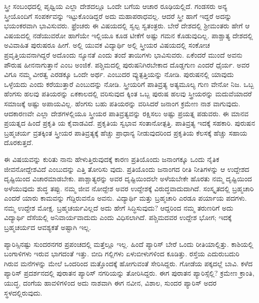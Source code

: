 ಸ್ತ್ರೀ ಸಂಬಂಧದಲ್ಲಿ ಪೃಥ್ವಿಯ ಎಲ್ಲಾ ದೇಶದಲ್ಲೂ ಒಂದೇ ಬಗೆಯ ಆಚಾರ ರೂಢಿಯಲ್ಲಿದೆ. ಗಂಡಸರು ಅನ್ಯ ಸ್ತ್ರೀಯೊಂದಿಗೆ ಸಂಪರ್ಕವನ್ನು ಇಟ್ಟುಕೊಂಡಿದ್ದರೆ ಅದು ಮಹಾಪರಾಧವಲ್ಲ. ಆದರೆ ಸ್ತ್ರೀ ಹಾಗೆ ಇದ್ದರೆ ಅದನ್ನು ಭಯಂಕರವಾಗಿ ಭಾವಿಸುವರು. ಫ್ರೆಂಚರು ಈ ವಿಷಯದಲ್ಲಿ ಸ್ವಲ್ಪ ಸ್ವತಂತ್ರರು. ಬೇರೆ ದೇಶದಲ್ಲಿ ಶ‍್ರೀಮಂತರು ಹೇಗೆ ಆ ವಿಷಯದಲ್ಲಿ ನಡೆಯುವರೋ ಹಾಗೆಯೇ ಇಲ್ಲಿಯೂ ಕೂಡ ಟೀಕೆಗೆ ಅಷ್ಟು ಗಮನ ಕೊಡುವುದಿಲ್ಲ. ಪಾಶ್ಚಾತ್ಯ ದೇಶದಲ್ಲಿ ಅವಿವಾಹಿತ ಪುರುಷರೂ ಹೀಗೆ. ಅಲ್ಲಿ ಯುವಕ ವಿದ್ಯಾರ್ಥಿ ಅಲ್ಲಿ ಸ್ತ್ರೀಯರ ವಿಷಯದಲ್ಲಿ ಸಂಕೋಚ ಪ್ರವೃತ್ತಿಯವನಾಗಿದ್ದರೆ ಅದೊಂದು ನ್ಯೂನತೆ ಎಂದು ತಂದೆ ತಾಯಿಗಳು ಭಾವಿಸುವರು. ಏಕೆಂದರೆ ಮುಂದೆ ಅವನು ಪೌರುಷ ಹೀನನಾಗುತ್ತಾನೆ ಎಂಬ ಅಂಜಿಕೆ. ಪಶ್ಚಿಮದಲ್ಲಿ ಪುರುಷನಿಗಿರಬೇಕಾದ ದೊಡ್ಡಗುಣ ಎಂದರೆ ಧೈರ್ಯ. ಅವರ  ವಿಗೂ ನಮ್ಮ ವೀರತ್ವ ಎರಡಕ್ಕೂ ಒಂದೇ ಅರ್ಥ.  ಎಂಬುದರ ವ್ಯುತ್ಪತ್ತಿಯನ್ನು ನೋಡಿ. ಪುರುಷನಲ್ಲಿ ಯಾವುದು ಒಳ್ಳೆಯದು ಎಂದು ಕರೆಯುತ್ತಾರೆ ಎಂಬುದನ್ನು ನೋಡಿ. ಸ್ತ್ರೀಯರಿಗೆ ಪಾತಿವ್ರತ್ಯ ಅತ್ಯಮೂಲ್ಯ ಗುಣ ವೇನೋ ನಿಜ. ಒಬ್ಬ ಹೆಂಗಸು ಹಲವು ಪತಿಯರನ್ನು ಏಕಕಾಲದಲ್ಲಿ ವರಿಸುವುದ ಕ್ಕಿಂತ ಒಬ್ಬ ಪುರುಷ ಹಲವು ಸ್ತ್ರೀಯರನ್ನು ಮದುವೆಯಾದರೆ ಸಮಾಜಕ್ಕೆ ಅಷ್ಟು ಅಪಾಯವಿಲ್ಲ. ಹೆಂಗಸು ಬಹು ಪತಿಯರನ್ನು ವರಿಸಿದರೆ ಜನಾಂಗ ಕ್ರಮೇಣ ನಾಶ ವಾಗುವುದು. ಆದಕಾರಣವೇ ಎಲ್ಲಾ ದೇಶಗಳಲ್ಲಿಯೂ ಸ್ತ್ರೀಯರ ಪಾತಿವ್ರತ್ಯವನ್ನು ರಕ್ಷಿಸಲು ಅಷ್ಟು ಪ್ರಯತ್ನ ಪಡುವರು. ಈ ಮಾನವ ಪ್ರಯತ್ನದ ಹಿಂದೆ ಪ್ರಕೃತಿ ಯ ಕೈವಾಡವಿದೆ. ಪ್ರಕೃತಿಯ ಸ್ವಭಾವ ಸಂತಾನೋತ್ಪತ್ತಿ. ಪಾತಿವ್ರತ್ಯ ಇದಕ್ಕೆ ಸಹಕಾರಿ. ಪುರುಷನ ಬ್ರಹ್ಮಚರ್ಯ ವ್ರತಕ್ಕಿಂತ ಸ್ತ್ರೀಯರ ಪಾತಿವ್ರತ್ಯಕ್ಕೆ ಹೆಚ್ಚು ಪ್ರಾಧಾನ್ಯ ನೀಡುವುದರಿಂದ ಪ್ರಕೃತಿಯ ಕೆಲಸಕ್ಕೆ ಹೆಚ್ಚು ಸಹಾಯ ದೊರಕುತ್ತದೆ.

ಈ ವಿಷಯವನ್ನು ಕುರಿತು ನಾನು ಹೇಳುತ್ತಿರುವುದಕ್ಕೆ ಕಾರಣ ಪ್ರತಿಯೊಂದು ಜನಾಂಗಕ್ಕೂ ಒಂದು ನೈತಿಕ ಜೀವನೋದ್ದೇಶವಿದೆ ಎಂಬುದನ್ನು ಎತ್ತಿ ತೋರಿಸು ವುದು. ಪ್ರತಿಯೊಂದು ಜನಾಂಗದ ರೀತಿ ನೀತಿಗಳನ್ನು ಆ ಉದ್ದೇಶದ ದೃಷ್ಟಿಯಿಂದ ವಿಚಾರಮಾಡಬೇಕು. ಪಾಶ್ಚಾತ್ಯರನ್ನು ಅವರ ದೃಷ್ಟಿಯಿಂದಲೇ ಅಳೆಯಬೇಕೇ ಹೊರತು ನಮ್ಮ ದೃಷ್ಟಿಯಿಂದ ಅಳೆಯುವುದು ಶುದ್ಧ ತಪ್ಪು. ನಮ್ಮ ಜೀವ ನೋದ್ದೇಶ ಅವರ ಉದ್ದೇಶಕ್ಕೆ ವಿರುದ್ಧವಾದುದಾಗಿದೆ. ಸಂಸ್ಕೃತದಲ್ಲಿ ಬ್ರಹ್ಮಚಾರಿ ಎಂದರೆ ಯಾರು ಕಾಮವನ್ನು ಗೆದ್ದಿರುವನೊ ಅವನು. ವಿದ್ಯಾರ್ಥಿ ಮತ್ತು ಬ್ರಹ್ಮಚಾರಿ ಎರಡೂ ಪರ್ಯಾಯ ಪದಗಳು. ನಮ್ಮ ಉದ್ದೇಶ ಮೋಕ್ಷ. ಬ್ರಹ್ಮಚರ್ಯವಿಲ್ಲದೆ ಅದು ಹೇಗೆ ಸಿದ್ಧಿಸುವುದು? ಆದ್ದರಿಂದ ನಮ್ಮ ತರುಣರಿಗೆ ಅದು ವಿದ್ಯಾರ್ಥಿ ದೆಸೆಯಲ್ಲಿ ಅನಿವಾರ್ಯವಾದುದು ಎಂದು ವಿಧಿಸಲಾಗಿದೆ. ಪಶ್ಚಿಮದವರ ಉದ್ದೇಶ ಭೋಗ; ಇದಕ್ಕೆ ಬ್ರಹ್ಮಚರ್ಯದ ಆವಶ್ಯಕತೆ ಅಷ್ಟಾಗಿ ಇಲ್ಲ.

ಪ್ಯಾರಿಸ್ಸಿನಷ್ಟು ಸುಂದರನಗರ ಪ್ರಪಂಚದಲ್ಲಿ ಮತ್ತೆಲ್ಲೂ ಇಲ್ಲ. ಹಿಂದೆ ಪ್ಯಾರಿಸ್​ ಬೇರೆ ಒಂದು ರೀತಿಯಾಲ್ಲಿತ್ತು. ಕಾಶಿಯಲ್ಲಿ ಬಂಗಾಳಿಗಳು ಇರುವ ಭಾಗದಂತೆ ಇತ್ತು. ಬೀದಿ ಗಲ್ಲಿಗಳು ಏಳುಬೀಳುಗಳಿಂದ ಕೂಡಿತ್ತು. ರಸ್ತೆಯ ಎದುರುಬದುರಿ ಗಿರುವ ಮನೆಗಳನ್ನು ಮೇಲೆ ಒಂದರಿಂದ ಮತ್ತೊಂದಕ್ಕೆ ಹೋಗುವಂತೆ ಸೇರಿಸಿದ್ದರು. ಗೋಡೆಯ ಪಕ್ಕದಲ್ಲೆ ಬಾವಿ. ಕಳೆದ ಪ್ಯಾರಿಸ್​ ಪ್ರದರ್ಶನದಲ್ಲಿ ಪುರಾತನ ಪ್ಯಾರಿಸ್​ ನಗರಿಯನ್ನು ತೋರಿಸಿದ್ದರು. ಈಗ ಪುರಾತನ ಪ್ಯಾರಿಸ್ಸೆಲ್ಲಿ? ಕ್ರಮೇಣ ಕ್ರಾಂತಿ, ಯುದ್ಧ, ದಂಗೆಯ ಹಾವಳಿಗಳಿಂದ ಅದು ನಾಶವಾಗಿ ಈಗ ನವೀನ, ವಿಶಾಲ, ಸುಂದರ ಪ್ಯಾರಿಸ್​ ಅದರ ಸ್ಥಳದಲ್ಲಿರುವುದು.

